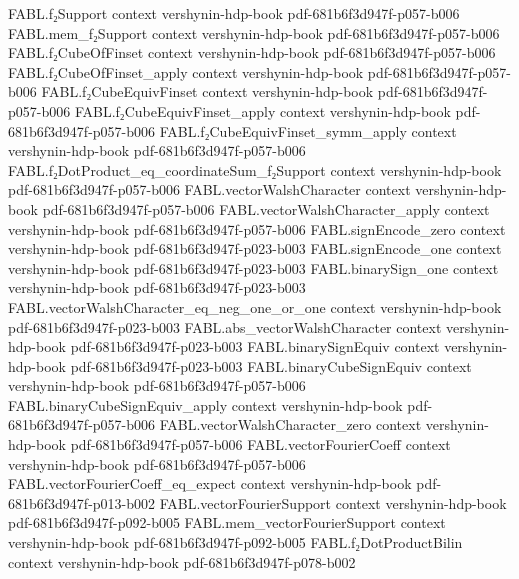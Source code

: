 \begin{theorem}
\proofstep
  {FABL.f₂Support}
  {context}
  {vershynin-hdp-book}
  {pdf-681b6f3d947f-p057-b006}
\proofstep
  {FABL.mem_f₂Support}
  {context}
  {vershynin-hdp-book}
  {pdf-681b6f3d947f-p057-b006}
\proofstep
  {FABL.f₂CubeOfFinset}
  {context}
  {vershynin-hdp-book}
  {pdf-681b6f3d947f-p057-b006}
\proofstep
  {FABL.f₂CubeOfFinset_apply}
  {context}
  {vershynin-hdp-book}
  {pdf-681b6f3d947f-p057-b006}
\proofstep
  {FABL.f₂CubeEquivFinset}
  {context}
  {vershynin-hdp-book}
  {pdf-681b6f3d947f-p057-b006}
\proofstep
  {FABL.f₂CubeEquivFinset_apply}
  {context}
  {vershynin-hdp-book}
  {pdf-681b6f3d947f-p057-b006}
\proofstep
  {FABL.f₂CubeEquivFinset_symm_apply}
  {context}
  {vershynin-hdp-book}
  {pdf-681b6f3d947f-p057-b006}
\proofstep
  {FABL.f₂DotProduct_eq_coordinateSum_f₂Support}
  {context}
  {vershynin-hdp-book}
  {pdf-681b6f3d947f-p057-b006}
\proofstep
  {FABL.vectorWalshCharacter}
  {context}
  {vershynin-hdp-book}
  {pdf-681b6f3d947f-p057-b006}
\proofstep
  {FABL.vectorWalshCharacter_apply}
  {context}
  {vershynin-hdp-book}
  {pdf-681b6f3d947f-p057-b006}
\proofstep
  {FABL.signEncode_zero}
  {context}
  {vershynin-hdp-book}
  {pdf-681b6f3d947f-p023-b003}
\proofstep
  {FABL.signEncode_one}
  {context}
  {vershynin-hdp-book}
  {pdf-681b6f3d947f-p023-b003}
\proofstep
  {FABL.binarySign_one}
  {context}
  {vershynin-hdp-book}
  {pdf-681b6f3d947f-p023-b003}
\proofstep
  {FABL.vectorWalshCharacter_eq_neg_one_or_one}
  {context}
  {vershynin-hdp-book}
  {pdf-681b6f3d947f-p023-b003}
\proofstep
  {FABL.abs_vectorWalshCharacter}
  {context}
  {vershynin-hdp-book}
  {pdf-681b6f3d947f-p023-b003}
\proofstep
  {FABL.binarySignEquiv}
  {context}
  {vershynin-hdp-book}
  {pdf-681b6f3d947f-p023-b003}
\proofstep
  {FABL.binaryCubeSignEquiv}
  {context}
  {vershynin-hdp-book}
  {pdf-681b6f3d947f-p057-b006}
\proofstep
  {FABL.binaryCubeSignEquiv_apply}
  {context}
  {vershynin-hdp-book}
  {pdf-681b6f3d947f-p057-b006}
\proofstep
  {FABL.vectorWalshCharacter_zero}
  {context}
  {vershynin-hdp-book}
  {pdf-681b6f3d947f-p057-b006}
\proofstep
  {FABL.vectorFourierCoeff}
  {context}
  {vershynin-hdp-book}
  {pdf-681b6f3d947f-p057-b006}
\proofstep
  {FABL.vectorFourierCoeff_eq_expect}
  {context}
  {vershynin-hdp-book}
  {pdf-681b6f3d947f-p013-b002}
\proofstep
  {FABL.vectorFourierSupport}
  {context}
  {vershynin-hdp-book}
  {pdf-681b6f3d947f-p092-b005}
\proofstep
  {FABL.mem_vectorFourierSupport}
  {context}
  {vershynin-hdp-book}
  {pdf-681b6f3d947f-p092-b005}
\proofstep
  {FABL.f₂DotProductBilin}
  {context}
  {vershynin-hdp-book}
  {pdf-681b6f3d947f-p078-b002}
\proofstep

\end{theorem}
